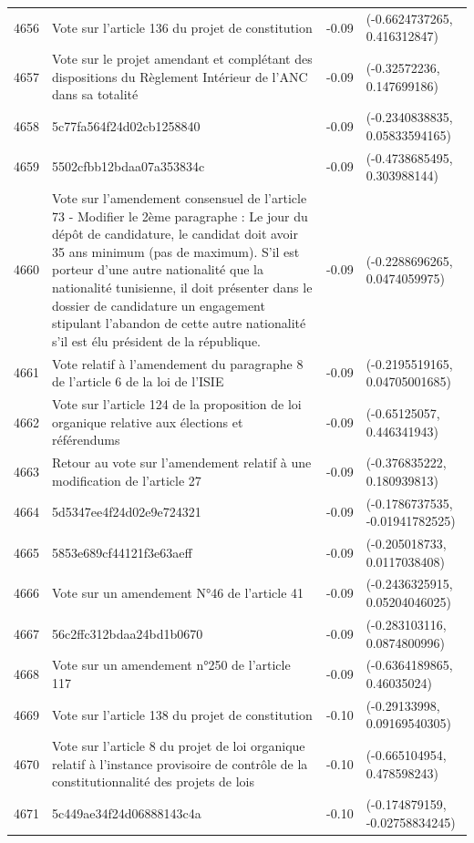 \begin{table}[ht]
\begin{tabular}{rlrl}
  4656 & Vote sur l'article 136 du projet de constitution & -0.09 & (-0.6624737265, 0.416312847) \\ 
  4657 & Vote sur le projet amendant et complétant des dispositions du Règlement Intérieur de l'ANC dans sa totalité & -0.09 & (-0.32572236, 0.147699186) \\ 
  4658 & 5c77fa564f24d02cb1258840 & -0.09 & (-0.2340838835, 0.05833594165) \\ 
  4659 & 5502cfbb12bdaa07a353834c & -0.09 & (-0.4738685495, 0.303988144) \\ 
  4660 & Vote sur l'amendement consensuel de l'article 73 - Modifier le 2ème paragraphe :  Le jour du dépôt de candidature, le candidat doit avoir 35 ans minimum (pas de maximum). S’il est porteur d’une autre nationalité que la nationalité tunisienne, il doit présenter dans le dossier de candidature un engagement stipulant l’abandon de cette autre nationalité s’il est élu président de la république. & -0.09 & (-0.2288696265, 0.0474059975) \\ 
  4661 & Vote relatif à l'amendement du paragraphe 8 de l'article 6 de la loi de l'ISIE & -0.09 & (-0.2195519165, 0.04705001685) \\ 
  4662 & Vote sur l'article 124 de la proposition de loi organique relative aux élections et référendums & -0.09 & (-0.65125057, 0.446341943) \\ 
  4663 & Retour au vote sur l'amendement relatif à une modification de l'article 27 & -0.09 & (-0.376835222, 0.180939813) \\ 
  4664 & 5d5347ee4f24d02e9e724321 & -0.09 & (-0.1786737535, -0.01941782525) \\ 
  4665 & 5853e689cf44121f3e63aeff & -0.09 & (-0.205018733, 0.0117038408) \\ 
  4666 & Vote sur un amendement N°46 de l'article 41 & -0.09 & (-0.2436325915, 0.05204046025) \\ 
  4667 & 56c2ffc312bdaa24bd1b0670 & -0.09 & (-0.283103116, 0.0874800996) \\ 
  4668 & Vote sur un amendement n°250 de l'article 117 & -0.09 & (-0.6364189865, 0.46035024) \\ 
  4669 & Vote sur l'article 138 du projet de constitution & -0.10 & (-0.29133998, 0.09169540305) \\ 
  4670 & Vote sur l'article 8 du projet de loi organique relatif à l'instance provisoire de contrôle de la constitutionnalité des projets de lois & -0.10 & (-0.665104954, 0.478598243) \\ 
  4671 & 5c449ae34f24d06888143c4a & -0.10 & (-0.174879159, -0.02758834245) \\ 

\end{tabular}
\end{table}
